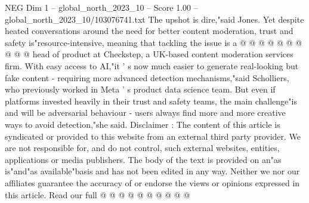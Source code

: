 \begin{textsample}{NEG Dim 1 – global\_north\_2023\_10 – Score 1.00 – global\_north\_2023\_10/103076741.txt}
The upshot is dire,"said Jones.
Yet despite heated conversations around the need for better content moderation, trust and safety is"resource-intensive, meaning that tackling the issue is a @ @ @ @ @ @ @ @ @ @ head of product at Checkstep, a UK-based content moderation services firm.
With easy access to AI,"it ' s now much easier to generate real-looking but fake content - requiring more advanced detection mechanisms,"said Scholliers, who previously worked in Meta ' s product data science team.
But even if platforms invested heavily in their trust and safety teams, the main challenge"is and will be adversarial behaviour - users always find more and more creative ways to avoid detection,"she said.
Disclaimer : The content of this article is syndicated or provided to this website from an external third party provider.
We are not responsible for, and do not control, such external websites, entities, applications or media publishers.
The body of the text is provided on an"as is"and"as available"basis and has not been edited in any way.
Neither we nor our affiliates guarantee the accuracy of or endorse the views or opinions expressed in this article.
Read our full @ @ @ @ @ @ @ @ @ @

\end{textsample}
